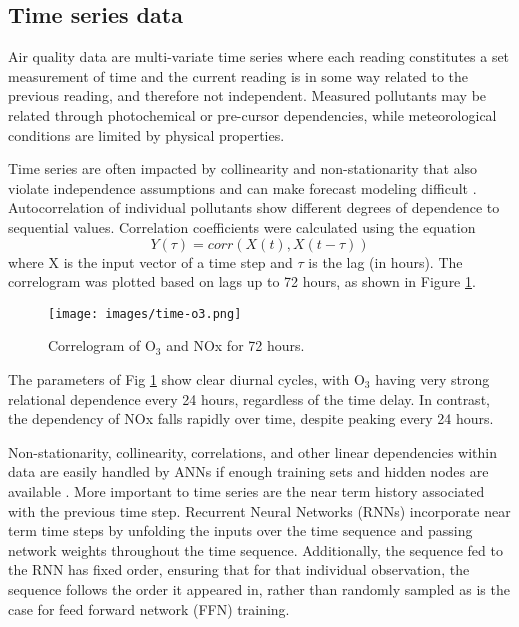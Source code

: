 \documentclass[preprint,12pt,authoryear]{elsarticle}
\begin{document}
\begin{linenumbers}
\subsection{Time series data}
Air quality data are multi-variate time series where each reading constitutes a set measurement of time and the current reading is in some way related to the previous reading, and therefore not independent. Measured pollutants may be related through photochemical or pre-cursor dependencies, while meteorological conditions are limited by physical properties. 

Time series are often impacted by collinearity and non-stationarity that also violate independence assumptions and can make forecast modeling difficult \citep{Gheyas2011}. Autocorrelation of individual pollutants show different degrees of dependence to sequential values.  Correlation coefficients were calculated using the equation
%
\begin{equation}
\label{eq:corr}
Y(\tau)= corr(X(t),X(t - \tau))
\end{equation}
%
where X is the input vector of a time step and $\tau$ is the lag (in hours). The correlogram was plotted based on lags up to 72 hours, as shown in Figure \ref{fig:serialcorr}.
%
\begin{figure}[H]
\centering
\texttt{[image: images/time-o3.png]}  %
\caption{Correlogram of O$_{3}$ and NOx for 72 hours.}
\label{fig:serialcorr}
\end{figure}
%
The parameters of Fig \ref{fig:serialcorr} show clear diurnal cycles, with O$_{3}$ having very strong relational dependence every 24 hours, regardless of the time delay. In contrast, the dependency of NOx falls rapidly over time, despite peaking every 24 hours. 

Non-stationarity, collinearity, correlations, and other linear dependencies within data are easily handled by ANNs if enough training sets and hidden nodes are available \citep{Goodfellow2016}. More important to time series are the near term history associated with the previous time step. Recurrent Neural Networks (RNNs) incorporate near term time steps by unfolding the inputs over the time sequence and passing network weights throughout the time sequence. Additionally, the sequence fed to the RNN has fixed order, ensuring that for that individual observation, the sequence follows the order it appeared in, rather than randomly sampled as is the case for feed forward network (FFN) training.


\end{linenumbers}
\end{document}
